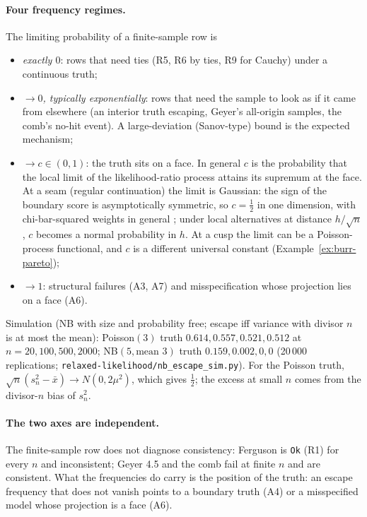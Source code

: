 \documentclass[11pt]{article}
\theoremstyle{definition}
\theoremstyle{remark}
\begin{document}
\paragraph{Four frequency regimes.} The limiting probability of a
finite-sample row is
\begin{itemize}
\item \emph{exactly $0$}: rows that need ties (R5, R6 by ties, R9 for Cauchy)
  under a continuous truth;
\item \emph{$\to0$, typically exponentially}: rows that need the sample to
  look as if it came from elsewhere (an interior truth escaping, Geyer's
  all-origin samples, the comb's no-hit event). A large-deviation
  (Sanov-type) bound is the expected mechanism;
\item \emph{$\to c\in(0,1)$}: the truth sits on a face. In general $c$ is
  the probability that the local limit of the likelihood-ratio process
  attains its supremum at the face. At a seam (regular continuation) the
  limit is Gaussian: the sign of the boundary score is asymptotically
  symmetric, so $c=\frac12$ in one dimension, with chi-bar-squared weights in
  general \cite{selfliang}; under local alternatives at distance $h/\sqrt n$,
  $c$ becomes a normal probability in $h$. At a cusp the limit can be a
  Poisson-process functional, and $c$ is a different universal constant
  (Example~\ref{ex:burr-pareto});
\item \emph{$\to1$}: structural failures (A3, A7) and misspecification whose
  projection lies on a face (A6).
\end{itemize}
Simulation (NB with size and probability free; escape iff variance with
divisor $n$ is at most the mean): Poisson$(3)$ truth $0.614, 0.557, 0.521,
0.512$ at $n=20,100,500,2000$; NB$(5,\text{mean }3)$ truth $0.159, 0.002, 0,
0$ (20\,000 replications;
\texttt{relaxed-likelihood/nb\_escape\_sim.py}). For the Poisson truth,
$\sqrt n(s_n^2-\bar x)\to N(0,2\mu^2)$, which gives $\frac12$; the excess at
small $n$ comes from the divisor-$n$ bias of $s_n^2$.

\paragraph{The two axes are independent.} The finite-sample row does not
diagnose consistency: Ferguson is \texttt{Ok} (R1) for every $n$ and
inconsistent; Geyer 4.5 and the comb fail at finite $n$ and are
consistent. What the frequencies do carry is the position of the truth: an
escape frequency that does not vanish points to a boundary truth (A4) or a
misspecified model whose projection is a face (A6).
\end{document}
